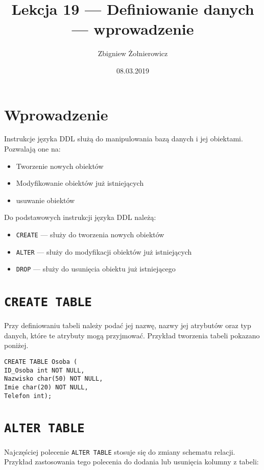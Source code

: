 \documentclass{article}
\begin{document}
\title{Lekcja 19 --- Definiowanie danych --- wprowadzenie}
\author{Zbigniew Żołnierowicz}
\date{08.03.2019}

\maketitle

\section{Wprowadzenie}

Instrukcje języka DDL służą do manipulowania bazą danych i jej obiektami. Pozwalają one na:
\begin{itemize}
  \item Tworzenie nowych obiektów
  \item Modyfikowanie obiektów już istniejących
  \item usuwanie obiektów
\end{itemize}
Do podstawowych instrukcji języka DDL należą:
\begin{itemize}
  \item {\tt CREATE} --- służy do tworzenia nowych obiektów
  \item {\tt ALTER} --- służy do modyfikacji obiektów już istniejących
  \item {\tt DROP} --- służy do usunięcia obiektu już istniejącego
\end{itemize}
\section{\tt CREATE TABLE}

Przy definiowaniu tabeli należy podać jej nazwę, nazwy jej atrybutów oraz typ danych, które te atrybuty mogą przyjmować. Przykład tworzenia tabeli pokazano poniżej.

\begin{verbatim}
CREATE TABLE Osoba (
ID_Osoba int NOT NULL,
Nazwisko char(50) NOT NULL,
Imie char(20) NOT NULL,
Telefon int);
\end{verbatim}

\section{\tt ALTER TABLE}

Najczęściej polecenie {\tt ALTER TABLE} stosuje się do zmiany schematu relacji. Przykład zastosowania tego polecenia do dodania lub usunięcia kolumny z tabeli:
\end{document}
